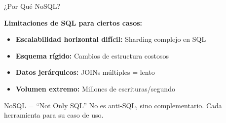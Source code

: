 \documentclass[aspectratio=169]{beamer}
\begin{document}
\begin{frame}{¿Por Qué NoSQL?}
    \centering
    
    \vspace{0.5cm}
    \textbf{Limitaciones de SQL para ciertos casos:}
    \begin{itemize}
        \item \textbf{Escalabilidad horizontal difícil:} Sharding complejo en SQL
        \item \textbf{Esquema rígido:} Cambios de estructura costosos
        \item \textbf{Datos jerárquicos:} JOINs múltiples = lento
        \item \textbf{Volumen extremo:} Millones de escrituras/segundo
    \end{itemize}
    
    \vspace{0.3cm}
    \begin{block}{NoSQL = ``Not Only SQL''}
        No es anti-SQL, sino complementario. Cada herramienta para su caso de uso.
    \end{block}
\end{frame}
\end{document}

